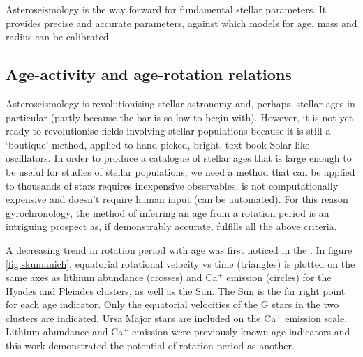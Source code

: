 Asteroseismology is the way forward for fundamental stellar parameters.
It provides precise and accurate parameters, against which models for age,
mass and radius can be calibrated.

\subsection{Age-activity and age-rotation relations}

Asteroseismology is revolutionising stellar astronomy and, perhaps, stellar
ages in particular (partly because the bar is so low to begin with).
However, it is not yet ready to  revolutionise fields involving stellar
populations because it is still a `boutique' method, applied to hand-picked,
bright, text-book Solar-like oscillators.
In order to produce a catalogue of stellar ages that is large enough to be
useful for studies of stellar populations, we need a method that can be
applied to thousands of stars \ie requires inexpensive observables, is not
computationally expensive and doesn't require human input (can be automated).
For this reason gyrochronology, the method of inferring an age from a rotation
period is an intriguing prospect as, if demonstrably accurate, fulfills all
the above criteria.

A decreasing trend in rotation period with age was first noticed in the
\citet{skumanich1972}.
In figure \ref{fig:skumanich}, equatorial rotational velocity vs time
(triangles) is plotted on the same axes as lithium abundance (crosses) and
Ca$^+$ emission (circles) for the Hyades and Pleiades clusters, as well as the
Sun.
The Sun is the far right point for each age indicator.
Only the equatorial velocities of the G stars in the two clusters are
indicated.
Ursa Major stars are included on the Ca$^+$ emission scale.
Lithium abundance and Ca$^+$ emission were previously known age indicators and
this work demonstrated the potential of rotation period as another.

